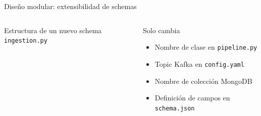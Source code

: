 \documentclass[aspectratio=169, 10pt]{beamer}
\begin{document}
\begin{frame}{Dise\~no modular: extensibilidad de schemas}
\begin{columns}[c]
\begin{exampleblock}{Estructura de un nuevo schema}
        \hspace{8pt}\texttt{ingestion.py}
      \end{exampleblock}
      \vspace{6pt}
      \begin{block}{Solo cambia}
        \begin{itemize}\setlength\itemsep{2pt}
          \item Nombre de clase en \texttt{pipeline.py}
          \item Topic Kafka en \texttt{config.yaml}
          \item Nombre de colecci\'on MongoDB
          \item Definici\'on de campos en \texttt{schema.json}
        \end{itemize}
      \end{block}
  \end{columns}
\end{frame}
\end{document}
